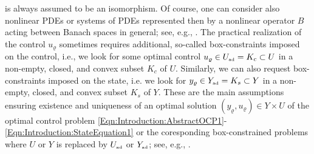 \documentclass{article}
\numberwithin{equation}{section}
\begin{document}
is always assumed to be an isomorphism. Of course, one can consider also
nonlinear PDEs or systems of PDEs represented then by a nonlinear operator
$B$ acting between Banach spaces in general; 
see, e.g., \cite{Troeltzsch:2010Book}. 
The practical realization of the control $u_\varrho$ sometimes requires
additional, so-called box-constraints imposed on the control, i.e., we look
for some optimal control $u_\varrho \in U_\text{\tiny ad} = K_c \subset U$ in
a non-empty, closed, and convex subset $K_c$ of $U$. Similarly, we can also
request box-constraints imposed on the state, i.e. we look for  
$y_\varrho \in Y_\text{\tiny ad} = K_s \subset Y$ in a non-empty, closed, 
and convex subset $K_s$ of $Y$. These are the main assumptions ensuring  
existence and uniqueness of an optimal solution
$(y_\varrho,u_\varrho) \in Y \times U$ of the optimal control problem
\eqref{Eqn:Introduction:AbstractOCP1}-\eqref{Eqn:Introduction:StateEquation1}
or the coresponding box-constrained problems where $U$ or $Y$ is replaced
by $U_\text{\tiny ad}$ or $Y_\text{\tiny ad}$; see, e.g.,
\cite{DeLosReyes:2015Book,Lions:1968Book,Troeltzsch:2010Book}.
\end{document}
